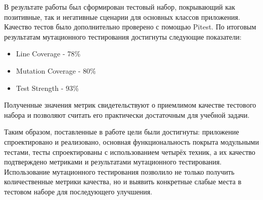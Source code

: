 В результате работы был сформирован тестовый набор, покрывающий как позитивные, так и негативные сценарии для основных классов приложения. Качество тестов было дополнительно проверено с помощью Pitest. По итоговым результатам мутационного тестирования достигнуты следующие показатели:
\begin{itemize}
	\item Line Coverage - 78\%
	\item Mutation Coverage - 80\%
	\item Test Strength - 93\%
\end{itemize}
Полученные значения метрик свидетельствуют о приемлимом качестве тестового набора и позволяют считать его практически достаточным для учебной задачи.

Таким образом, поставленные в работе цели были достигнуты: приложение спроектировано и реализовано, основная функциональность покрыта модульными тестами, тесты спроектированы с использованием четырёх техник, а их качество подтверждено метриками и результатами мутационного тестирования. Использование мутационного тестирования позволило не только получить количественные метрики качества, но и выявить конкретные слабые места в тестовом наборе для последующего улучшения.
